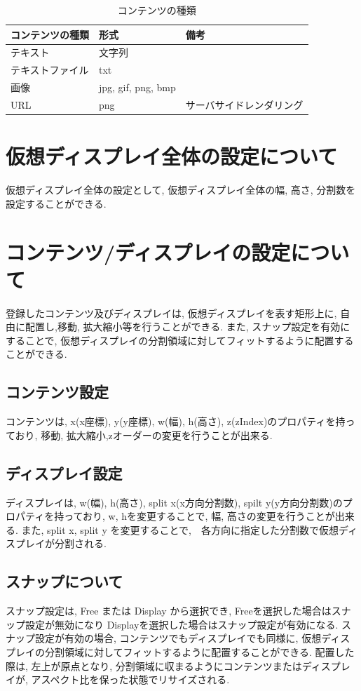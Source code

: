 \documentclass[a4paper,10pt,oneside]{jsbook}
\begin{document}
\begin{table}[htbp]
\begin{center}
\caption{コンテンツの種類}
\label{contentstype}
\begin{tabular}{|l|l|l|}
\hline
コンテンツの種類 & 形式 & 備考 \\
\hline
\hline
テキスト & 文字列 & \\
\hline
テキストファイル & txt & \\
\hline
画像	& jpg, gif, png, bmp & \\
\hline
URL	& png & サーバサイドレンダリング \\
\hline

\end{tabular}
\end{center}
\end{table}

\section{仮想ディスプレイ全体の設定について}
仮想ディスプレイ全体の設定として, 仮想ディスプレイ全体の幅, 高さ, 分割数を設定することができる. 

\section{コンテンツ/ディスプレイの設定について}
登録したコンテンツ及びディスプレイは, 仮想ディスプレイを表す矩形上に, 自由に配置し,移動, 拡大縮小等を行うことができる. また, スナップ設定を有効にすることで, 仮想ディスプレイの分割領域に対してフィットするように配置することができる.

\subsection{コンテンツ設定}
コンテンツは, x(x座標), y(y座標), w(幅), h(高さ), z(zIndex)のプロパティを持っており, 移動, 拡大縮小,zオーダーの変更を行うことが出来る.

\subsection{ディスプレイ設定}
ディスプレイは, w(幅), h(高さ), split x(x方向分割数), spilt y(y方向分割数)のプロパティを持っており, w, hを変更することで, 幅, 高さの変更を行うことが出来る. 
また, split x, split y を変更することで,　各方向に指定した分割数で仮想ディスプレイが分割される.

\subsection{スナップについて}
スナップ設定は, Free または Display から選択でき, Freeを選択した場合はスナップ設定が無効になり Displayを選択した場合はスナップ設定が有効になる.
スナップ設定が有効の場合, コンテンツでもディスプレイでも同様に, 仮想ディスプレイの分割領域に対してフィットするように配置することができる.
配置した際は, 左上が原点となり, 分割領域に収まるようにコンテンツまたはディスプレイが, アスペクト比を保った状態でリサイズされる.\\
\end{document}
